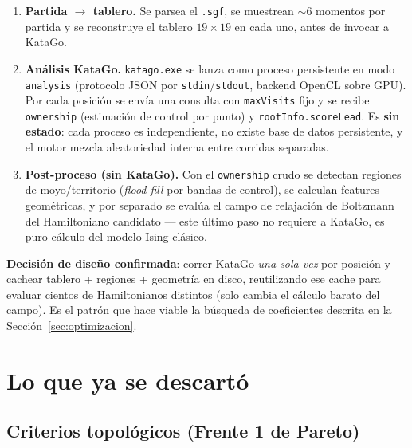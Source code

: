 \documentclass[11pt, a4paper]{article}
\begin{document}
\begin{enumerate}
  \item \textbf{Partida $\to$ tablero.} Se parsea el \texttt{.sgf}, se
  muestrean $\sim$6 momentos por partida y se reconstruye el tablero
  $19\times19$ en cada uno, antes de invocar a KataGo.

  \item \textbf{An\'alisis KataGo.} \texttt{katago.exe} se lanza como
  proceso persistente en modo \texttt{analysis} (protocolo JSON por
  \texttt{stdin}/\texttt{stdout}, backend OpenCL sobre GPU). Por cada
  posici\'on se env\'ia una consulta con \texttt{maxVisits} fijo y se
  recibe \texttt{ownership} (estimaci\'on de control por punto) y
  \texttt{rootInfo.scoreLead}. Es \textbf{sin estado}: cada proceso es
  independiente, no existe base de datos persistente, y el motor mezcla
  aleatoriedad interna entre corridas separadas.

  \item \textbf{Post-proceso (sin KataGo).} Con el \texttt{ownership}
  crudo se detectan regiones de moyo/territorio (\emph{flood-fill}
  por bandas de control), se calculan features geom\'etricas, y por
  separado se eval\'ua el campo de relajaci\'on de Boltzmann del
  Hamiltoniano candidato --- este \'ultimo paso no requiere a KataGo,
  es puro c\'alculo del modelo Ising cl\'asico.
\end{enumerate}

\begin{tcolorbox}[quotebox]
  \textbf{Decisi\'on de dise\~no confirmada}: correr KataGo \emph{una
  sola vez} por posici\'on y cachear tablero + regiones + geometr\'ia
  en disco, reutilizando ese cache para evaluar cientos de
  Hamiltonianos distintos (solo cambia el c\'alculo barato del campo).
  Es el patr\'on que hace viable la b\'usqueda de coeficientes descrita
  en la Secci\'on~\ref{sec:optimizacion}.
\end{tcolorbox}

\section{Lo que ya se descart\'o}

\subsection{Criterios topol\'ogicos (Frente 1 de Pareto)}
\end{document}
